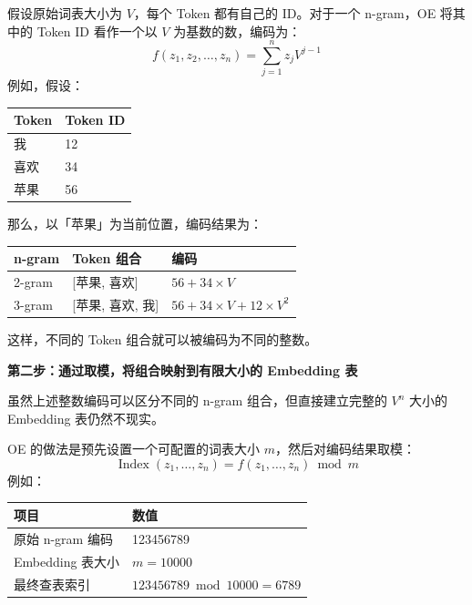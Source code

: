 \documentclass[11pt]{article}
\begin{document}
假设原始词表大小为 $V$，每个 Token 都有自己的 ID。对于一个 n-gram，OE 将其中的 Token ID 看作一个以 $V$ 为基数的数，编码为：
\[
  f(z_1,z_2,\ldots,z_n)=\sum_{j=1}^{n}z_j V^{j-1}
\]
例如，假设：

\begin{table}[htbp]
  \centering
  \small
  \begin{tabular}{p{4.0cm}p{4.0cm}}
    \hline
    \textbf{Token} & \textbf{Token ID} \\
    \hline
    我 & 12 \\
    喜欢 & 34 \\
    苹果 & 56 \\
    \hline
  \end{tabular}
\end{table}

那么，以「苹果」为当前位置，编码结果为：

\begin{table}[htbp]
  \centering
  \small
  \begin{tabular}{p{4.0cm}p{5.0cm}p{6.0cm}}
    \hline
    \textbf{n-gram} & \textbf{Token 组合} & \textbf{编码} \\
    \hline
    2-gram & [苹果, 喜欢] & $56 + 34 \times V$ \\
    \hline
    3-gram & [苹果, 喜欢, 我] & $56 + 34 \times V + 12 \times V^2$ \\
    \hline
  \end{tabular}
\end{table}

这样，不同的 Token 组合就可以被编码为不同的整数。

\textbf{第二步：通过取模，将组合映射到有限大小的 Embedding 表}

虽然上述整数编码可以区分不同的 n-gram 组合，但直接建立完整的 $V^n$ 大小的 Embedding 表仍然不现实。

OE 的做法是预先设置一个可配置的词表大小 $m$，然后对编码结果取模：
\[
  \operatorname{Index}(z_1,\ldots,z_n)=f(z_1,\ldots,z_n)\bmod m
\]
例如：

\begin{table}[htbp]
  \centering
  \small
  \begin{tabular}{p{6.0cm}p{5.0cm}}
    \hline
    \textbf{项目} & \textbf{数值} \\
    \hline
    原始 n-gram 编码 & 123456789 \\
    Embedding 表大小 & $m=10000$ \\
    最终查表索引 & $123456789 \bmod 10000 = 6789$ \\
    \hline
  \end{tabular}
\end{table}
\end{document}
